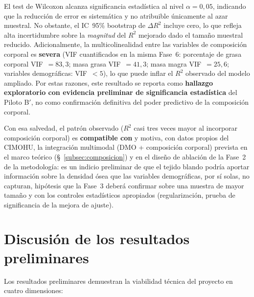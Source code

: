 \documentclass[../tesis.tex]{subfiles}
\begin{document}
El test de Wilcoxon alcanza significancia estadística al nivel $\alpha = 0{,}05$, indicando que la reducción de error es sistemática y no atribuible únicamente al azar muestral. No obstante, el IC~95\% bootstrap de $\Delta R^2$ incluye cero, lo que refleja alta incertidumbre sobre la \textit{magnitud} del $R^2$ mejorado dado el tamaño muestral reducido. Adicionalmente, la multicolinealidad entre las variables de composición corporal es \textbf{severa} (VIF cuantificados en la misma Fase~6: porcentaje de grasa corporal VIF~$= 83{,}3$; masa grasa VIF~$= 41{,}3$; masa magra VIF~$= 25{,}6$; variables demográficas: VIF~$< 5$), lo que puede inflar el $R^2$ observado del modelo ampliado. Por estas razones, este resultado se reporta como \textbf{hallazgo exploratorio con evidencia preliminar de significancia estadística} del Piloto B$'$, no como confirmación definitiva del poder predictivo de la composición corporal.

Con esa salvedad, el patrón observado ($R^2$ casi tres veces mayor al incorporar composición corporal) es \textbf{compatible con} y motiva, con datos propios del CIMOHU, la integración multimodal (DMO + composición corporal) prevista en el marco teórico (§~\ref{subsec:composicion}) y en el diseño de ablación de la Fase~2 de la metodología: es un indicio preliminar de que el tejido blando podría aportar información sobre la densidad ósea que las variables demográficas, por sí solas, no capturan, hipótesis que la Fase~3 deberá confirmar sobre una muestra de mayor tamaño y con los controles estadísticos apropiados (regularización, prueba de significancia de la mejora de ajuste).

\section{Discusión de los resultados preliminares}
\label{sec:discusion_preliminar}

Los resultados preliminares demuestran la viabilidad técnica del proyecto en cuatro dimensiones:
\end{document}
